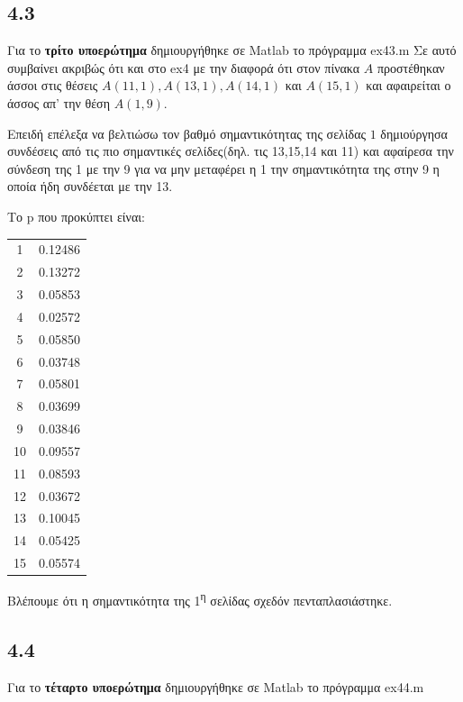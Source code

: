 \documentclass[a4paper,11pt]{article}
\begin{document}
\begin{flushleft}
\subsection*{4.3}
Για το \textbf{τρίτο υποερώτημα} δημιουργήθηκε σε Matlab το πρόγραμμα ex43.m
Σε αυτό συμβαίνει ακριβώς ότι και στο ex4 με την διαφορά ότι στον πίνακα $A$ προστέθηκαν άσσοι στις θέσεις $A(11,1), A(13,1), A(14,1)$ και $A(15,1)$ και αφαιρείται ο άσσος απ' την θέση $A(1,9)$.

Επειδή επέλεξα να βελτιώσω τον βαθμό σημαντικότητας της σελίδας $1$ δημιούργησα συνδέσεις από τις πιο σημαντικές σελίδες(δηλ. τις 13,15,14 και 11) και αφαίρεσα την σύνδεση της 1 με την 9 για να μην μεταφέρει η 1 την σημαντικότητα της στην 9 η οποία ήδη συνδέεται με την 13.

Το p που προκύπτει είναι:
\begin{center}
    \begin{tabular}{|c|c|}
        \hline
        1 & 0.12486 \\
        2 & 0.13272 \\
        3 & 0.05853 \\
        4 & 0.02572 \\
        5 & 0.05850 \\
        6 & 0.03748 \\
        7 & 0.05801 \\
        8 & 0.03699 \\
        9 & 0.03846 \\
        10 & 0.09557 \\
        11 & 0.08593 \\
        12 & 0.03672 \\
        13 & 0.10045 \\
        14 & 0.05425 \\
        15 & 0.05574 \\
        \hline
    \end{tabular}
\end{center}

Βλέπουμε ότι η σημαντικότητα της 1\textsuperscript{η} σελίδας σχεδόν πενταπλασιάστηκε.

\subsection*{4.4}
Για το \textbf{τέταρτο υποερώτημα} δημιουργήθηκε σε Matlab το πρόγραμμα ex44.m


\end{flushleft}
\end{document}
